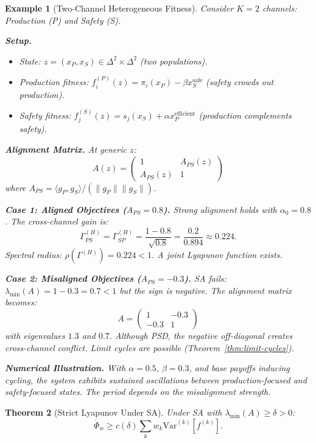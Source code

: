 \documentclass[12pt]{article}
\newtheorem{theorem}{Theorem}[section]
\newtheorem{example}[theorem]{Example}
\newcommand{\Var}{\mathrm{Var}}
\begin{document}
\begin{example}[Two-Channel Heterogeneous Fitness]
\label{ex:two-channel}
Consider $K = 2$ channels: Production (P) and Safety (S).

\textbf{Setup.}
\begin{itemize}
    \item State: $z = (x_P, x_S) \in \Delta^2 \times \Delta^2$ (two populations).
    \item Production fitness: $f^{(P)}_i(z) = \pi_i(x_P) - \beta x_S^{\text{safe}}$ (safety crowds out production).
    \item Safety fitness: $f^{(S)}_j(z) = s_j(x_S) + \alpha x_P^{\text{efficient}}$ (production complements safety).
\end{itemize}

\textbf{Alignment Matrix.}
At generic $z$:
\[
A(z) = \begin{pmatrix} 1 & A_{PS}(z) \\ A_{PS}(z) & 1 \end{pmatrix}
\]
where $A_{PS} = \langle g_P, g_S \rangle / (\|g_P\| \|g_S\|)$.

\textbf{Case 1: Aligned Objectives ($A_{PS} = 0.8$).}
Strong alignment holds with $\alpha_0 = 0.8$. The cross-channel gain is:
\[
\Gamma^{(H)}_{PS} = \Gamma^{(H)}_{SP} = \frac{1 - 0.8}{\sqrt{0.8}} = \frac{0.2}{0.894} \approx 0.224.
\]
Spectral radius: $\rho(\Gamma^{(H)}) = 0.224 < 1$. A joint Lyapunov function exists.

\textbf{Case 2: Misaligned Objectives ($A_{PS} = -0.3$).}
SA fails: $\lambda_{\min}(A) = 1 - 0.3 = 0.7 < 1$ but the sign is negative. The alignment matrix becomes:
\[
A = \begin{pmatrix} 1 & -0.3 \\ -0.3 & 1 \end{pmatrix}
\]
with eigenvalues $1.3$ and $0.7$. Although PSD, the negative off-diagonal creates cross-channel conflict. Limit cycles are possible (Theorem~\ref{thm:limit-cycles}).

\textbf{Numerical Illustration.}
With $\alpha = 0.5$, $\beta = 0.3$, and base payoffs inducing cycling, the system exhibits sustained oscillations between production-focused and safety-focused states. The period depends on the misalignment strength.
\end{example}

\begin{theorem}[Strict Lyapunov Under SA]
\label{thm:sa-strict}
Under SA with $\lambda_{\min}(A) \geq \delta > 0$:
\[
\dot{\Phi}_w \geq c(\delta) \sum_k w_k \Var^{(k)}[f^{(k)}].
\]
\end{theorem}
\end{document}
